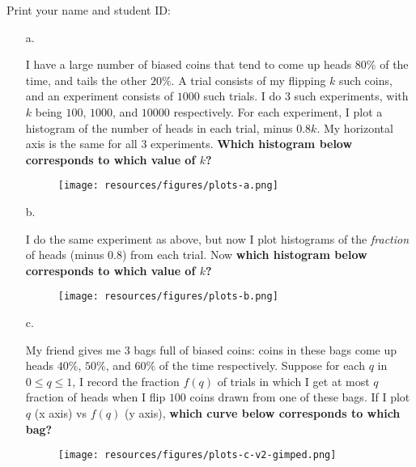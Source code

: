 \documentclass[11pt,fleqn]{article}
\newcommand{\fillin}[1]{\underline{\hskip #1}}
\newcommand{\startnewpage}{\newpage \noindent \vspace{0mm} {\sc Print} your name and student ID: \fillin{5in}\\[-0.2in]}
\begin{document}
\begin{qunlist}
\startnewpage


\begin{itemize}

\item[a. ]{I have a large number of biased coins that tend to come up heads $80\%$ of the time, and tails
the other $20\%$. A trial consists of my flipping $k$ such coins, and an experiment
consists of $1000$ such trials. I do $3$ such experiments, with $k$ being $100$, $1000$, and $10000$ respectively. 
For each experiment, I plot a histogram of the number of heads in each
trial, minus $0.8 k$. 
My horizontal axis is the same for all $3$ experiments. {\bf Which histogram below corresponds to which value of $k$?}
\begin{figure*}[htbp]
	\vspace{-0.5em}
	\centering
	{
		\hspace{0em}\texttt{[image: resources/figures/plots-a.png]}
	}
	\vspace{-0.5em}
    \vspace{-0.5em}
\end{figure*}
}

\item[b. ]{I do the same experiment as above, but now I plot
    histograms of the \textit{fraction} of heads (minus 0.8) from each trial. 
    Now {\bf which histogram below corresponds to which value of $k$?}
\begin{figure*}[htbp]
	\vspace{-0.5em}
	\centering
	{
		\hspace{0em}\texttt{[image: resources/figures/plots-b.png]}
	}
	\vspace{-0.5em}
    \vspace{-0.5em}
\end{figure*}
}

\item[c. ]{My friend gives me $3$ bags full of biased coins: coins in these bags come up 
        heads $40\%$, $50\%$, and $60\%$ of the time respectively. Suppose for each 
        $q$ in $0 \leq q \leq 1$, I record the fraction $f(q)$ of
        trials in which I get at most $q$ fraction of heads when I
        flip $100$ coins drawn from one of these bags.  If I plot
        $q$ (x axis) vs $f(q)$ (y axis), {\bf which curve below corresponds
        to which bag? }
\begin{figure*}[htbp]
	\vspace{-0.2em}
	\centering
	{
		\hspace{0em}\texttt{[image: resources/figures/plots-c-v2-gimped.png]}
	}
	\vspace{-0.5em}
    \vspace{-0.5em}
\end{figure*}
}
\end{itemize}


\end{qunlist}
\end{document}
